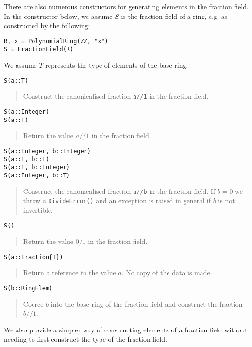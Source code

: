 \documentclass[a4paper,10pt]{article}
\newcommand{\code}{\lstinline}
\newcommand{\desc}[1]{\vspace{-3mm}\begin{quote}#1\end{quote}}
\begin{document}
There are also numerous constructors for generating elements in the fraction
field. In the constructor below, we assume $S$ is the fraction field of a ring,
e.g. as constructed by the following:

\begin{lstlisting}
R, x = PolynomialRing(ZZ, "x")
S = FractionField(R)
\end{lstlisting}

We assume $T$ represents the type of elements of the base ring.

\begin{lstlisting}
S(a::T)
\end{lstlisting}

\desc{Construct the canonicalised fraction \code{a//1} in the fraction field.}

\begin{lstlisting}
S(a::Integer)
S(a::T)
\end{lstlisting}

\desc{Return the value $a//1$ in the fraction field.}

\begin{lstlisting}
S(a::Integer, b::Integer)
S(a::T, b::T)
S(a::T, b::Integer)
S(a::Integer, b::T)
\end{lstlisting}

\desc{Construct the canonicalised fraction \code{a//b} in the fraction field. If
$b = 0$ we throw a \code{DivideError()} and an exception is raised in general
if $b$ is not invertible.}

\begin{lstlisting}
S()
\end{lstlisting}

\desc{Return the value $0/1$ in the fraction field.}

\begin{lstlisting}
S(a::Fraction{T})
\end{lstlisting}

\desc{Return a reference to the value $a$. No copy of the data is made.}

\begin{lstlisting}
S(b::RingElem)
\end{lstlisting}

\desc{Coerce $b$ into the base ring of the fraction field and construct the
fraction $b//1$.}

We also provide a simpler way of constructing elements of a fraction field
without needing to first construct the type of the fraction field. 
\end{document}
